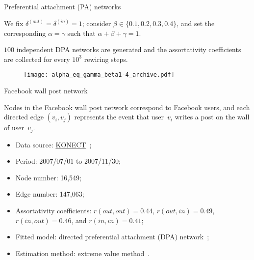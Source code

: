 \documentclass[xcolor=dvipsnames, compress, 10pt]{beamer}
\theoremstyle{remark}
\newcommand{\deltain}{\delta^{(in)}}
\newcommand{\deltaout}{\delta^{(out)}}
\begin{document}

\begin{frame}{Preferential attachment (PA) networks}

We fix $\deltaout = \deltain = 1$; consider $\beta \in \{0.1, 0.2, 0.3, 0.4\}$,
and set the corresponding $\alpha = \gamma$ such that 
$\alpha + \beta + \gamma = 1$.



$100$ independent DPA networks are generated and the assortativity
coefficients are collected for every $10^3$ rewiring steps.

\begin{figure}
	\centering
	\texttt{[image: alpha\_eq\_gamma\_beta1-4\_archive.pdf]}
\end{figure}

\end{frame}


\begin{frame}{Facebook wall post network}


Nodes in the Facebook wall post network correspond to
Facebook users, and each directed edge $(v_i,v_j)$ represents 
the event that user~$v_i$ writes a post on the wall of user~$v_j$.

\begin{itemize}
	\item Data source:
	\href{http://konect.cc/networks/facebook-wosn-wall/}{KONECT}~\citep{Kunegis2013konect};
	\item Period: 2007/07/01 to 2007/11/30;
	\item Node number: 16,549;
	\item Edge number: 147,063;
	\item Assortativity coefficients: $r(out, out) = 0.44$, 
	$r(out, in) = 0.49$, $r(in, out) = 0.46$, 
	and $r(in, in) = 0.41$;
	\item Fitted model: directed preferential 
	attachment (DPA) network~\citep{Bollobas2003proceedings};
	\item Estimation method: extreme value method~\citep{Wan2020extreme}.
\end{itemize}


\end{frame}
\end{document}
